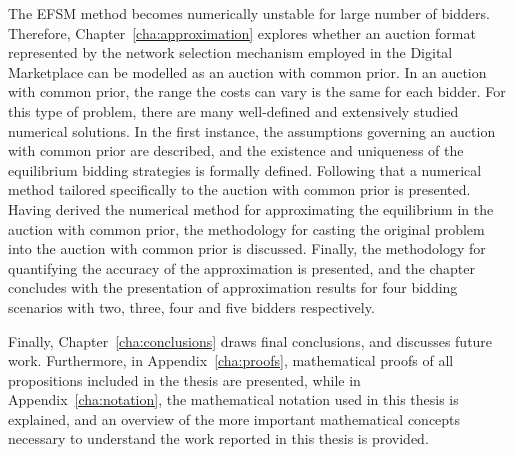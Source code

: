 The EFSM method becomes numerically unstable for large number of bidders. Therefore, Chapter~\ref{cha:approximation} explores whether an auction format represented by the network selection mechanism employed in the Digital Marketplace can be modelled as an auction with common prior. In an auction with common prior, the range the costs can vary is the same for each bidder. For this type of problem, there are many well-defined and extensively studied numerical solutions. In the first instance, the assumptions governing an auction with common prior are described, and the existence and uniqueness of the equilibrium bidding strategies is formally defined. Following that a numerical method tailored specifically to the auction with common prior is presented. Having derived the numerical method for approximating the equilibrium in the auction with common prior, the methodology for casting the original problem into the auction with common prior is discussed. Finally, the methodology for quantifying the accuracy of the approximation is presented, and the chapter concludes with the presentation of approximation results for four bidding scenarios with two, three, four and five bidders respectively.

Finally, Chapter~\ref{cha:conclusions} draws final conclusions, and discusses future work. Furthermore, in Appendix~\ref{cha:proofs}, mathematical proofs of all propositions included in the thesis are presented, while in Appendix~\ref{cha:notation}, the mathematical notation used in this thesis is explained, and an overview of the more important mathematical concepts necessary to understand the work reported in this thesis is provided.

